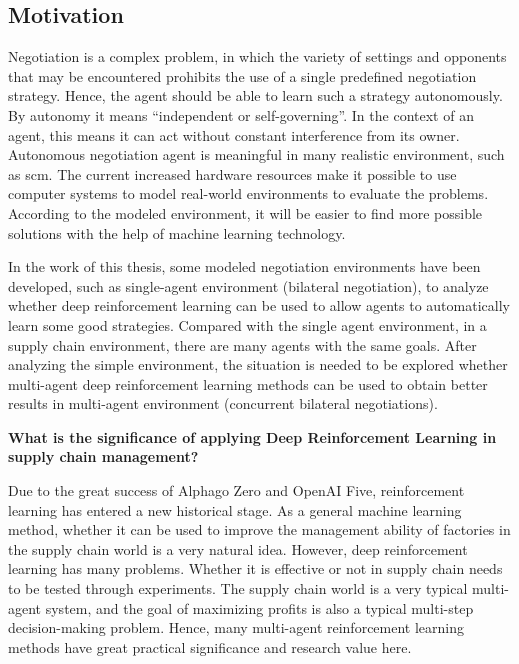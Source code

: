 \subsection{Motivation}
Negotiation is a complex problem, in which the variety of settings and opponents that may be encountered prohibits the use of a single predefined negotiation strategy. Hence, the agent should be able to learn such a strategy autonomously\parencite{Bakker2019RLBOAAM}. By autonomy it means “independent or self-governing”. In the context of an agent, this means it can act without constant interference from its owner\parencite{Fetch.ai2019}. Autonomous negotiation agent is meaningful in many realistic environment, such as \gls{scm}. The current increased hardware resources make it possible to use computer systems to model real-world environments to evaluate the problems. According to the modeled environment, it will be easier to find more possible solutions with the help of machine learning technology.

In the work of this thesis, some modeled negotiation environments have been developed, such as single-agent environment (bilateral negotiation), to analyze whether deep reinforcement learning can be used to allow agents to automatically learn some good strategies. Compared with the single agent environment, in a supply chain environment, there are many agents with the same goals. After analyzing the simple environment, the situation is needed to be explored whether multi-agent deep reinforcement learning methods can be used to obtain better results in multi-agent environment (concurrent bilateral negotiations).

\textbf{What is the significance of applying Deep Reinforcement Learning in supply chain management?}

Due to the great success of Alphago Zero\parencite{Silver2017} and OpenAI Five\parencite{OpenAI2019}, reinforcement learning has entered a new historical stage. As a general machine learning method, whether it can be used to improve the management ability of factories in the supply chain world is a very natural idea. However, deep reinforcement learning has many problems. Whether it is effective or not in supply chain needs to be tested through experiments. The supply chain world is a very typical multi-agent system, and the goal of maximizing profits is also a typical multi-step decision-making problem. Hence, many multi-agent reinforcement learning methods have great practical significance and research value here.

